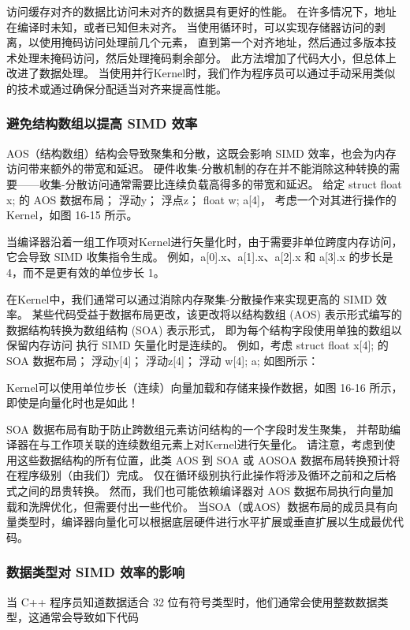 访问缓存对齐的数据比访问未对齐的数据具有更好的性能。 在许多情况下，地址在编译时未知，或者已知但未对齐。 
当使用循环时，可以实现存储器访问的剥离，以使用掩码访问处理前几个元素，
直到第一个对齐地址，然后通过多版本技术处理未掩码访问，然后处理掩码剩余部分。 
此方法增加了代码大小，但总体上改进了数据处理。 
当使用并行Kernel时，我们作为程序员可以通过手动采用类似的技术或通过确保分配适当对齐来提高性能。

\subsubsection{避免结构数组以提高 SIMD 效率}
AOS（结构数组）结构会导致聚集和分散，这既会影响 SIMD 效率，也会为内存访问带来额外的带宽和延迟。 
硬件收集-分散机制的存在并不能消除这种转换的需要——收集-分散访问通常需要比连续负载高得多的带宽和延迟。 
给定 struct {float x; 的 AOS 数据布局； 浮动y； 浮点z； float w;} a[4]，
考虑一个对其进行操作的Kernel，如图 16-15 所示。

当编译器沿着一组工作项对Kernel进行矢量化时，由于需要非单位跨度内存访问，它会导致 SIMD 收集指令生成。 
例如，a[0].x、a[1].x、a[2].x 和 a[3].x 的步长是 4，而不是更有效的单位步长 1。

在Kernel中，我们通常可以通过消除内存聚集-分散操作来实现更高的 SIMD 效率。 
某些代码受益于数据布局更改，该更改将以结构数组 (AOS) 表示形式编写的数据结构转换为数组结构 (SOA) 表示形式，
即为每个结构字段使用单独的数组以保留内存访问 执行 SIMD 矢量化时是连续的。 
例如，考虑 struct {float x[4]; 的 SOA 数据布局； 浮动y[4]； 浮动z[4]； 浮动 w[4];} a; 如图所示：

Kernel可以使用单位步长（连续）向量加载和存储来操作数据，如图 16-16 所示，即使是向量化时也是如此！

SOA 数据布局有助于防止跨数组元素访问结构的一个字段时发生聚集，
并帮助编译器在与工作项关联的连续数组元素上对Kernel进行矢量化。 
请注意，考虑到使用这些数据结构的所有位置，此类 AOS 到 SOA 或 AOSOA 数据布局转换预计将在程序级别（由我们）完成。 
仅在循环级别执行此操作将涉及循环之前和之后格式之间的昂贵转换。 
然而，我们也可能依赖编译器对 AOS 数据布局执行向量加载和洗牌优化，但需要付出一些代价。 
当SOA（或AOS）数据布局的成员具有向量类型时，编译器向量化可以根据底层硬件进行水平扩展或垂直扩展以生成最优代码。

\subsubsection{数据类型对 SIMD 效率的影响}
当 C++ 程序员知道数据适合 32 位有符号类型时，他们通常会使用整数数据类型，这通常会导致如下代码

